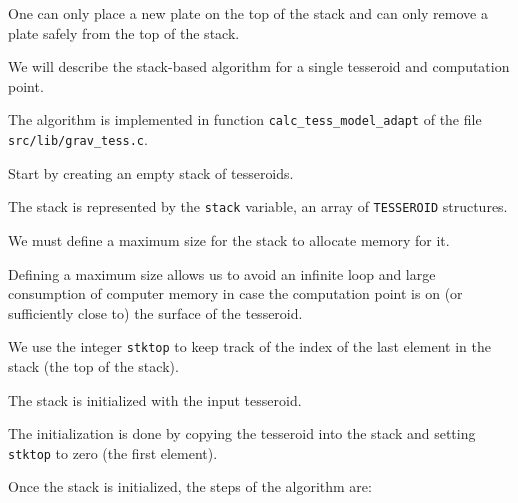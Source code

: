 \documentclass[paper,twocolumn]{geophysics}
\begin{document}
One can only place a new plate on the top of the stack and
can only remove a plate safely from the top of the stack.


We will describe the stack-based algorithm for a single tesseroid and
computation point.

The algorithm is implemented in function \texttt{calc\_tess\_model\_adapt}
of the file \texttt{src/lib/grav\_tess.c}.


Start by creating an empty stack of tesseroids.

The  stack is represented by the \texttt{stack} variable,
an array of \texttt{TESSEROID} structures.

We must define a maximum size for the stack to allocate memory for it.

Defining a maximum size allows us to avoid an infinite loop and large
consumption of computer memory in case the computation point is
on (or sufficiently close to) the surface of the tesseroid.

We use the integer \texttt{stktop} to keep track of the index of the last
element in the stack (the top of the stack).

The stack is initialized with the input tesseroid.

The initialization is done by copying the tesseroid into the stack and
setting \texttt{stktop} to zero (the first element).

Once the stack is initialized, the steps of the algorithm are:
\end{document}
